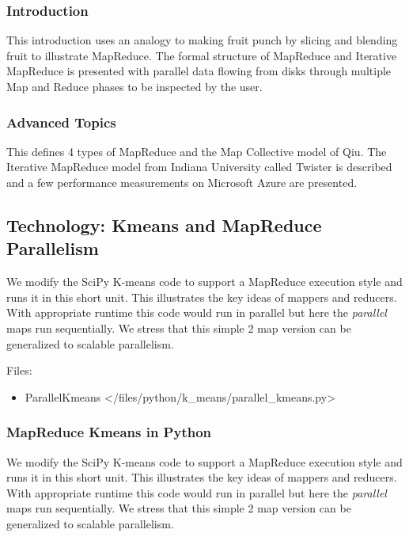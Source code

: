 \subsubsection{Introduction}\label{introduction}

This introduction uses an analogy to making fruit punch by slicing and
blending fruit to illustrate MapReduce. The formal structure of
MapReduce and Iterative MapReduce is presented with parallel data
flowing from disks through multiple Map and Reduce phases to be
inspected by the user.

\subsubsection{Advanced Topics}\label{advanced-topics}

This defines 4 types of MapReduce and the Map Collective model of Qiu.
The Iterative MapReduce model from Indiana University called Twister is
described and a few performance measurements on Microsoft Azure are
presented.

\subsection{Technology: Kmeans and MapReduce
Parallelism}\label{technology-kmeans-and-mapreduce-parallelism}

We modify the SciPy K-means code to support a MapReduce execution style
and runs it in this short unit. This illustrates the key ideas of
mappers and reducers. With appropriate runtime this code would run in
parallel but here the \emph{parallel} maps run sequentially. We stress
that this simple 2 map version can be generalized to scalable
parallelism.

Files:

\begin{itemize}
\tightlist
\item
  ParallelKmeans \textless{}/files/python/k\_means/parallel\_kmeans.py\textgreater{}
\end{itemize}

\subsubsection{MapReduce Kmeans in
Python}\label{mapreduce-kmeans-in-python}

We modify the SciPy K-means code to support a MapReduce execution style
and runs it in this short unit. This illustrates the key ideas of
mappers and reducers. With appropriate runtime this code would run in
parallel but here the \emph{parallel} maps run sequentially. We stress
that this simple 2 map version can be generalized to scalable
parallelism.

